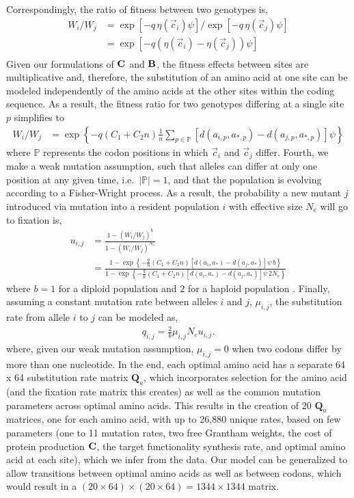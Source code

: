 \documentclass{article}
\newcommand{\Cost}{\ensuremath{\text{\textbf{C}}}\xspace}
\newcommand{\Func}{\ensuremath{\text{\textbf{B}}}\xspace}
\newcommand{\Ne}{\ensuremath{{N_e}}\xspace} %
\newcommand{\Qmatrix}{\mathbf{Q}\xspace}
\newcommand{\Qmatrixa}{\ensuremath{\Qmatrix_a}\xspace}
\newcommand{\aip}{\ensuremath{a_{i,p}}\xspace}
\newcommand{\ajp}{\ensuremath{a_{j,p}}\xspace}
\newcommand{\aopt}{\ensuremath{a_*}\xspace}
\newcommand{\aoptp}{\ensuremath{a_{*,p}}\xspace}
\newcommand{\cveci}{\ensuremath{\cvec_i}\xspace}
\newcommand{\cvecj}{\ensuremath{\cvec_j}\xspace}
\newcommand{\cvec}{\ensuremath{\Vec{c}}\xspace}
\newcommand{\muij}{\ensuremath{\mu_{i,j}}\xspace}
\newcommand{\setP}{\ensuremath{\mathbb{P}}\xspace}
\begin{document}
Correspondingly, the ratio of fitness between two genotypes is,
\begin{align*}
  W_i/W_j &=  \exp\left[- q \, \eta(\cveci) \psi\right]/\exp\left[- q \, \eta(\cvecj) \psi\right]\\
  &=  \exp\left[- q \left(\eta(\cveci)- \eta(\cvecj)\right) \psi\right]\\
\end{align*}
Given our formulations of \Cost and \Func, the fitness effects between sites are multiplicative and, therefore, the substitution of an amino acid at one site can be modeled independently of the amino acids at the other sites within the coding sequence.
As a result, the fitness ratio for two genotypes differing at a single site $p$ simplifies to
\begin{align}
 W_i/W_j  &= \exp\left\{- q \left(C_1 + C_2 n\right) \frac{1}{n} \sum_{p \in \setP} \left[d\left(\aip,\aoptp\right) - d\left(\ajp,\aoptp\right)\right] \psi \right\}
\end{align}
where \setP represents the codon positions in which \cveci and \cvecj differ.
Fourth, we make a weak mutation assumption, such that alleles can differ at only one position at any given time, i.e.~$|\setP| = 1$, and that the population is evolving according to a Fisher-Wright process.
As a result, the probability a new mutant $j$ introduced via mutation into a resident population $i$ with effective size \Ne will go to fixation is,
\begin{align*}
  u_{i,j} &=  \frac{1 - \left(W_i/W_j\right)^b}{1 - \left(W_i/W_j\right)^\Ne}\\
   &= \frac{1- \exp\left\{- \frac{q}{n} \left(C_1 + C_2 n\right) \left[d\left(a_i,\aopt\right) - d\left(a_j,\aopt\right)\right] \psi \,  b\right\}}  {1-\exp\left\{- \frac{q}{n} \left(C_1 + C_2 n\right) \left[d\left(a_i,\aopt\right) - d\left(a_j,\aopt\right)\right] \psi \, 2\Ne\right\}}
\end{align*}
where $b=1$ for a diploid population and $2$ for a haploid population \citep{Kimura1962,Wright1969,Iwasa1988,BergAndLassig2003,SellaAndHirsh2005}.
Finally, assuming a constant mutation rate between alleles $i$ and $j$, $\muij$, the substitution rate from allele $i$ to $j$ can be modeled as,
\begin{align*}
  q_{i,j} = \frac{2}{b} \muij \Ne u_{i,j}.
\end{align*}
where, given our weak mutation assumption, $\muij = 0$ when two codons differ by more than one nucleotide.
In the end, each optimal amino acid has a separate 64 x 64 substitution rate matrix \Qmatrixa, which incorporates selection for the amino acid (and the fixation rate matrix this creates) as well as the common mutation parameters across optimal amino acids.
This results in the creation of 20 \Qmatrixa matrices, one for each amino acid, with up to 26,880 unique rates, based on few parameters (one to 11 mutation rates, two free Grantham weights, the cost of protein production \Cost, the target functionality synthesis rate, and optimal amino acid at each site), which we infer from the data.
Our model can be generalized to allow transitions between optimal amino acids as well as between codons, which would result in a $(20 \times 64) \times (20 \times 64) =  1344 \times 1344$ matrix.
\end{document}
